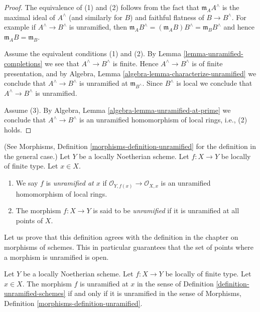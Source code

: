 \begin{proof}
The equivalence of (1) and (2) follows from the fact that
$\mathfrak m_AA^\wedge$ is the maximal ideal of $A^\wedge$
(and similarly for $B$) and faithful flatness of $B \to B^\wedge$.
For example if $A^\wedge \to B^\wedge$ is unramified, then
$\mathfrak m_AB^\wedge = (\mathfrak m_AB)B^\wedge = \mathfrak m_BB^\wedge$
and hence $\mathfrak m_AB = \mathfrak m_B$.

\medskip\noindent
Assume the equivalent conditions (1) and (2).
By Lemma \ref{lemma-unramified-completions}
we see that $A^\wedge \to B^\wedge$ is
finite. Hence $A^\wedge \to B^\wedge$ is of finite presentation, and by
Algebra, Lemma \ref{algebra-lemma-characterize-unramified}
we conclude that $A^\wedge \to B^\wedge$ is unramified at
$\mathfrak m_{B^\wedge}$. Since $B^\wedge$ is local we conclude
that $A^\wedge \to B^\wedge$ is unramified.

\medskip\noindent
Assume (3). By Algebra, Lemma \ref{algebra-lemma-unramified-at-prime}
we conclude that $A^\wedge \to B^\wedge$ is an unramified homomorphism
of local rings, i.e., (2) holds.
\end{proof}

\begin{definition}
\label{definition-unramified-schemes}
(See Morphisms, Definition \ref{morphisms-definition-unramified}
for the definition in the general case.)
Let $Y$ be a locally Noetherian scheme.
Let $f : X \to Y$ be locally of finite type.
Let $x \in X$.
\begin{enumerate}
\item We say $f$ is {\it unramified at $x$} if
$\mathcal{O}_{Y, f(x)} \to \mathcal{O}_{X, x}$
is an unramified homomorphism of local rings.
\item The morphism $f : X \to Y$ is said to be {\it unramified}
if it is unramified at all points of $X$.
\end{enumerate}
\end{definition}

\noindent
Let us prove that this definition agrees with the definition in the
chapter on morphisms of schemes. This in particular guarantees that the
set of points where a morphism is unramified is open.

\begin{lemma}
\label{lemma-unramified-definition}
Let $Y$ be a locally Noetherian scheme.
Let $f : X \to Y$ be locally of finite type.
Let $x \in X$. The morphism $f$ is unramified at $x$ in
the sense of Definition \ref{definition-unramified-schemes}
if and only if it is unramified in
the sense of Morphisms, Definition \ref{morphisms-definition-unramified}.
\end{lemma}

